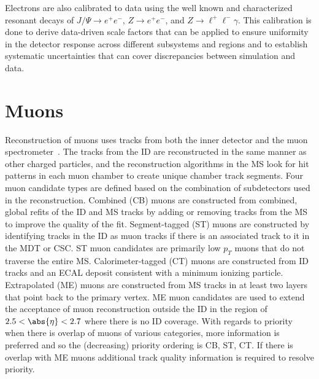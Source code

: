 Electrons are also calibrated to data using the well known and characterized resonant decays of $J/\Psi \to e^{+}e^{-}$, $Z \to e^{+}e^{-}$, and $Z \to \ell^{+}\ell^{-}\gamma$.
This calibration is done to derive data-driven \glspl{scale factor} that can be applied to ensure uniformity in the detector response across different subsystems and regions and to establish systematic uncertainties that can cover discrepancies between simulation and data.

\section{Muons}\label{section:muons}

Reconstruction of muons uses tracks from both the \gls{inner detector} and the \gls{muon spectrometer}~\cite{PERF-2015-10}.
The tracks from the ID are reconstructed in the same manner as other charged particles, and the reconstruction algorithms in the MS look for hit patterns in each muon chamber to create unique chamber track segments.
Four muon candidate types are defined based on the combination of subdetectors used in the reconstruction.
Combined (CB) muons are constructed from combined, global refits of the ID and MS tracks by adding or removing tracks from the MS to improve the quality of the fit.
Segment-tagged (ST) muons are constructed by identifying tracks in the ID as muon tracks if there is an associated track to it in the \gls{MDT} or \gls{CSC}.
ST muon candidates are primarily low $p_{T}$ muons that do not traverse the entire MS.
Calorimeter-tagged (CT) muons are constructed from ID tracks and an ECAL deposit consistent with a minimum ionizing particle.
Extrapolated (ME) muons are constructed from MS tracks in at least two layers that point back to the primary vertex.
ME muon candidates are used to extend the acceptance of muon reconstruction outside the ID in the region of $2.5 < \abs{\eta} < 2.7$ where there is no ID coverage.
With regards to priority when there is overlap of muons of various categories, more information is preferred and so the (decreasing) priority ordering is CB, ST, CT.
If there is overlap with ME muons additional track quality information is required to resolve priority.


